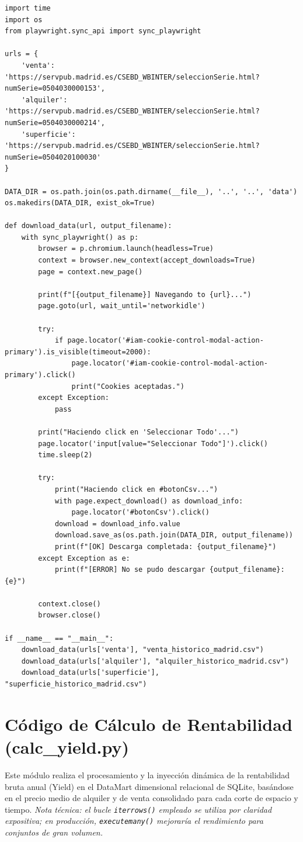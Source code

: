 \documentclass[a4paper,11pt,openany]{book}
\begin{document}
\begin{lstlisting}
import time
import os
from playwright.sync_api import sync_playwright

urls = {
    'venta': 'https://servpub.madrid.es/CSEBD_WBINTER/seleccionSerie.html?numSerie=0504030000153',
    'alquiler': 'https://servpub.madrid.es/CSEBD_WBINTER/seleccionSerie.html?numSerie=0504030000214',
    'superficie': 'https://servpub.madrid.es/CSEBD_WBINTER/seleccionSerie.html?numSerie=0504020100030'
}

DATA_DIR = os.path.join(os.path.dirname(__file__), '..', '..', 'data')
os.makedirs(DATA_DIR, exist_ok=True)

def download_data(url, output_filename):
    with sync_playwright() as p:
        browser = p.chromium.launch(headless=True)
        context = browser.new_context(accept_downloads=True)
        page = context.new_page()

        print(f"[{output_filename}] Navegando to {url}...")
        page.goto(url, wait_until='networkidle')

        try:
            if page.locator('#iam-cookie-control-modal-action-primary').is_visible(timeout=2000):
                page.locator('#iam-cookie-control-modal-action-primary').click()
                print("Cookies aceptadas.")
        except Exception:
            pass

        print("Haciendo click en 'Seleccionar Todo'...")
        page.locator('input[value="Seleccionar Todo"]').click()
        time.sleep(2)
        
        try:
            print("Haciendo click en #botonCsv...")
            with page.expect_download() as download_info:
                page.locator('#botonCsv').click()
            download = download_info.value
            download.save_as(os.path.join(DATA_DIR, output_filename))
            print(f"[OK] Descarga completada: {output_filename}")
        except Exception as e:
            print(f"[ERROR] No se pudo descargar {output_filename}: {e}")
        
        context.close()
        browser.close()

if __name__ == "__main__":
    download_data(urls['venta'], "venta_historico_madrid.csv")
    download_data(urls['alquiler'], "alquiler_historico_madrid.csv")
    download_data(urls['superficie'], "superficie_historico_madrid.csv")
\end{lstlisting}

\section{Código de Cálculo de Rentabilidad (calc\_yield.py)}
Este módulo realiza el procesamiento y la inyección dinámica de la rentabilidad bruta anual (Yield) en el DataMart dimensional relacional de SQLite, basándose en el precio medio de alquiler y de venta consolidado para cada corte de espacio y tiempo. \textit{Nota técnica: el bucle \texttt{iterrows()} empleado se utiliza por claridad expositiva; en producción, \texttt{executemany()} mejoraría el rendimiento para conjuntos de gran volumen.}
\end{document}
